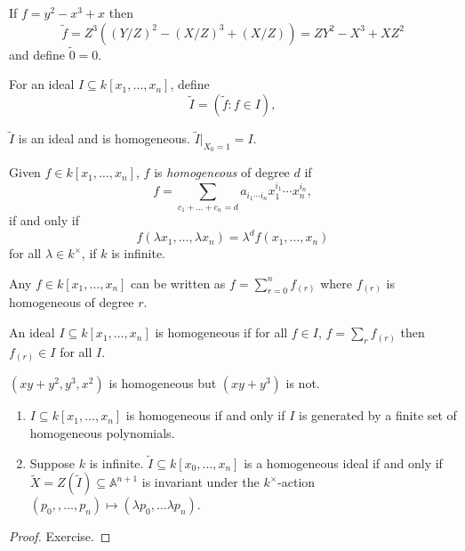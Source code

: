 \documentclass[a4paper]{article}
\renewcommand{\A}{\mathbb{A}}
\begin{document}
\begin{eg}
  If \(f = y^2 - x^3 + x\) then
  \[
    \tilde f = Z^3((Y/Z)^2 - (X/Z)^3 + (X/Z)) = ZY^2 - X^3 + XZ^2
  \]
  and define \(\tilde 0 = 0\).
\end{eg}

For an ideal \(I \subseteq k[x_1, \dots, x_n]\), define
\[
  \tilde I = (\tilde f: f \in I),
\]

\begin{ex}
  \(\tilde I\) is an ideal and is homogeneous. \(\tilde I|_{X_0 = 1} = I\).
\end{ex}

\begin{definition}
  Given \(f \in k[x_1, \dots, x_n]\), \(f\) is \emph{homogeneous} of degree \(d\) if
  \[
    f = \sum_{c_1 + \dots + c_n = d} a_{i_1 \cdots i_n} x_1^{i_1} \cdots x_n^{i_n},
  \]
  if and only if
  \[
    f(\lambda x_1, \dots, \lambda x_n) = \lambda^d f(x_1, \dots, x_n)
  \]
  for all \(\lambda \in k^\times\), if \(k\) is infinite.
\end{definition}

Any \(f \in k[x_1, \dots, x_n]\) can be written as \(f = \sum_{r = 0}^n f_{(r)}\) where \(f_{(r)}\) is homogeneous of degree \(r\).

\begin{definition}
  An ideal \(I \subseteq k[x_1, \dots, x_n]\) is homogeneous if for all \(f \in I\), \(f = \sum_r f_{(r)}\) then \(f_{(r)} \in I\) for all \(I\).
\end{definition}

\begin{eg}
  \((xy + y^2, y^3, x^2)\) is homogeneous but \((xy + y^3)\) is not.
\end{eg}

\begin{lemma}\leavevmode
  \begin{enumerate}
  \item \(I \subseteq k[x_1, \dots, x_n]\) is homogeneous if and only if \(I\) is generated by a finite set of homogeneous polynomials.
  \item Suppose \(k\) is infinite. \(\tilde I \subseteq k[x_0, \dots, x_n]\) is a homogeneous ideal if and only if \(\tilde X = Z(\tilde I) \subseteq \A^{n + 1}\) is invariant under the \(k^\times\)-action \((p_0,, \dots, p_n) \mapsto (\lambda p_0, \dots \lambda p_n)\).
  \end{enumerate}
\end{lemma}

\begin{proof}
  Exercise.
\end{proof}
\end{document}

